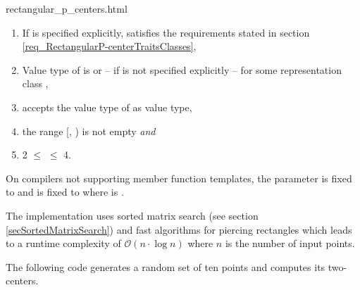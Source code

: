 \begin{ccHtmlClassFile}{rectangular_p_centers.html}
  \begin{enumerate}
  \item If  is specified explicitly,  satisfies the
    requirements stated in section
    \ref{req_RectangularP-centerTraitsClasses},
  \item Value type of  is 
    or -- if  is not specified explicitly --
     for some representation class ,
  \item {} accepts the value type of
     as value type,
  \item the range [, ) is not empty \textit{and}
  \item 2 $\le$  $\le$ 4.
  \end{enumerate}

  
  On compilers not supporting member function templates, the parameter
   is fixed to 
  and  is fixed to
   where  is
  .
  
  \ccImplementation The implementation uses sorted matrix search (see
  section \ref{secSortedMatrixSearch}) and fast algorithms for
  piercing rectangles\cite{sw-rpppp-96} which leads to a runtime
  complexity of $\mathcal{O}(n \cdot \log n)$ where $n$ is the number
  of input points.
  
  \ccExample The following code generates a random set of ten points
  and computes its two-centers.


\end{ccHtmlClassFile}

